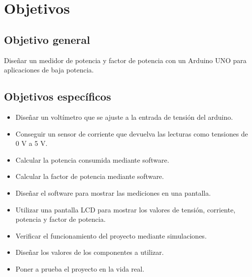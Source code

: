 \section{Objetivos}
\subsection{Objetivo general}
Diseñar un medidor de potencia y factor de potencia con un Arduino UNO para aplicaciones de baja potencia.

\subsection{Objetivos específicos}
\begin{itemize}
    \item Diseñar un voltímetro que se ajuste a la entrada de tensión  del arduino.
    \item Conseguir un sensor de corriente que devuelva las lecturas como tensiones de 0 V a 5 V.
    \item Calcular la potencia consumida mediante software.
    \item Calcular la factor de potencia  mediante software.
    \item Diseñar el software para mostrar las mediciones en una pantalla.
    \item Utilizar una pantalla LCD para mostrar los valores de tensión, corriente, potencia y factor de potencia.
    \item Verificar el funcionamiento del proyecto mediante simulaciones.
    \item Diseñar los valores de los componentes a utilizar.
    \item Poner a prueba el proyecto en la vida real.
\end{itemize}